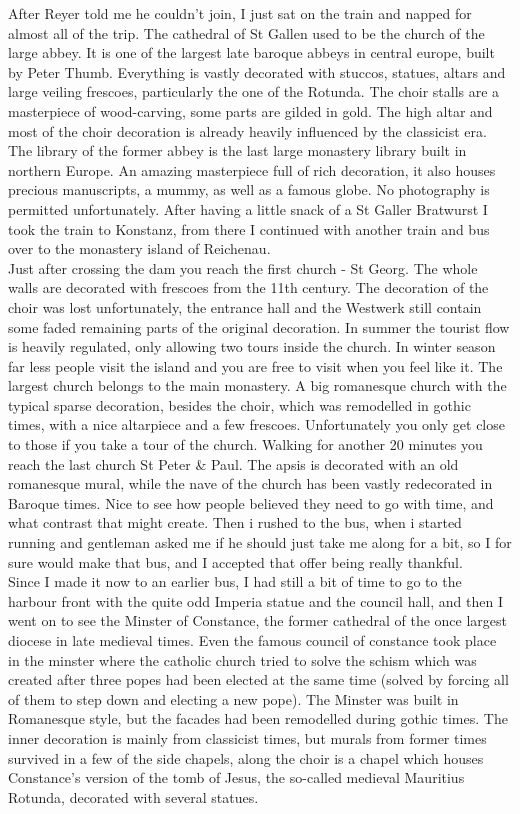 After Reyer told me he couldn't join, I just sat on the train and napped for almost all of the trip. The cathedral of St Gallen used to be the church of the large abbey. It is one of the largest late baroque abbeys in central europe, built by Peter Thumb. Everything is vastly decorated with stuccos, statues, altars and large veiling frescoes, particularly the one of the Rotunda. The choir stalls are a masterpiece of wood-carving, some parts are gilded in gold. The high altar and most of the choir decoration is already heavily influenced by the classicist era. The library of the former abbey is the last large monastery library built in northern Europe. An amazing masterpiece full of rich decoration, it also houses precious manuscripts, a mummy, as well as a famous globe. No photography is permitted unfortunately. After having a little snack of a St Galler Bratwurst I took the train to Konstanz, from there I continued with another train and bus over to the monastery island of Reichenau. \\
Just after crossing the dam you reach the first church - St Georg. The whole walls are decorated with frescoes from the 11th century. The decoration of the choir was lost unfortunately, the entrance hall and the Westwerk still contain some faded remaining parts of the original decoration. In summer the tourist flow is heavily regulated, only allowing two tours inside the church. In winter season far less people visit the island and you are free to visit when you feel like it. The largest church belongs to the main monastery. A big romanesque church with the typical sparse decoration, besides the choir, which was remodelled in gothic times, with a nice altarpiece and a few frescoes. Unfortunately you only get close to those if you take a tour of the church. Walking for another 20 minutes you reach the last church St Peter \& Paul. The apsis is decorated with an old romanesque mural, while the nave of the church has been vastly redecorated in Baroque times. Nice to see how people believed they need to go with time, and what contrast that might create. Then i rushed to the bus, when i started running and gentleman asked me if he should just take me along for a bit, so I for sure would make that bus, and I accepted that offer being really thankful.\\
 Since I made it now to an earlier bus, I had still a bit of time to go to the harbour front with the quite odd Imperia statue and the council hall, and then I went on to see the Minster of Constance, the former cathedral of the once largest diocese in late medieval times. Even the famous council of constance took place in the minster where the catholic church tried to solve the schism which was created after three popes had been elected at the same time (solved by forcing all of them to step down and electing a new pope). The Minster was built in Romanesque style, but the facades had been remodelled during gothic times. The inner decoration is mainly from classicist times, but murals from former times survived in a few of the side chapels, along the choir is a chapel which houses Constance's version of the tomb of Jesus, the so-called medieval Mauritius Rotunda, decorated with several statues.\\


